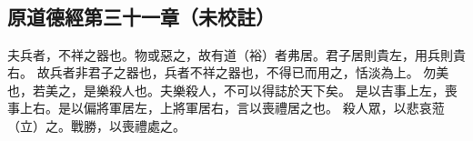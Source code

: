 ﻿%
%

\chapter{~}

\section{原道德經第三十一章（未校註）}

\begin{withgezhu}

\zhsong


\textcolor{tongjia-color}{夫兵者，不祥之器也。物或惡之，故有道（裕）者弗居。}君子居則貴左，用兵則貴右。
\textcolor{tongjia-color}{故兵者非君子之器也，兵者不祥之器也，不得已而用之，恬淡為上。}
勿美也，若美之，是樂殺人也。夫樂殺人，不可以得誌於天下矣。
是以吉事上左，喪事上右。是以偏將軍居左，上將軍居右，言以喪禮居之也。
殺人眾，\textcolor{tongjia-color}{以悲哀蒞（立）之}。戰勝，以喪禮處之。

\end{withgezhu}
